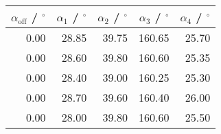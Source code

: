 \begin{tabular}{r|rrrr}\\
 $\alpha_\text{off}$ / ${}^\circ$ & $\alpha_1$ / ${}^\circ$ & $\alpha_2$ / ${}^\circ$ & $\alpha_3$ / ${}^\circ$ & $\alpha_4$ / ${}^\circ$  \\
 \hline
0.00 & 28.85 & 39.75 & 160.65 & 25.70\\
0.00 & 28.60 & 39.80 & 160.60 & 25.35\\
0.00 & 28.40 & 39.00 & 160.25 & 25.30\\
0.00 & 28.70 & 39.60 & 160.40 & 26.00\\
0.00 & 28.00 & 39.80 & 160.60 & 25.50
\end{tabular}
